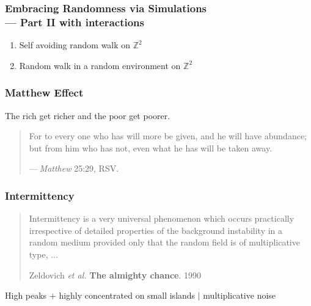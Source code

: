 \documentclass[9pt,xcolor=dvipsnames,table]{beamer}
\begin{document}
\begin{frame}[fragile] %

  \frametitle{Embracing Randomness via Simulations \\ \bigskip --- Part II with interactions}

 \begin{enumerate}
   \item Self avoiding random walk on $\mathbb{Z}^2$ \bigskip
   \item Random walk in a random environment on $\mathbb{Z}^2$ \bigskip
 \end{enumerate}
\end{frame}
\begin{frame}[fragile,t] %
  \frametitle{Matthew Effect}
  \begin{center}
   The rich get richer and the poor get poorer.
  \end{center}
  \bigskip
  \mySeparateLine
  \bigskip
  \begin{center}
    \begin{minipage}{0.7\textwidth}
      \begin{quotation}

        For to every one who has will more be given, and he will have abundance; but
        from him who has not, even what he has will be taken away.

        \bigskip
        \hfill --- {\it Matthew} 25:29, RSV.

      \end{quotation}
    \end{minipage}
  \end{center}
\end{frame}
\begin{frame}[fragile,t] %
  \frametitle{Intermittency}

  \begin{quotation}
    Intermittency is a very universal phenomenon which occurs practically
    irrespective of detailed properties of the background instability in a
    random medium provided only that the random field is of multiplicative
    type, ... \\
    \bigskip

    \begin{flushright}
      {\small Zeldovich {\it et al.} {\bf The almighty chance}. 1990}
    \end{flushright}
    \end{quotation}
  \bigskip
  \mySeparateLine
  \bigskip
  \bigskip

  \begin{center}
    High peaks $+$ highly concentrated on small islands $\bigg|$ multiplicative noise
  \end{center}
\end{frame}
\end{document}
